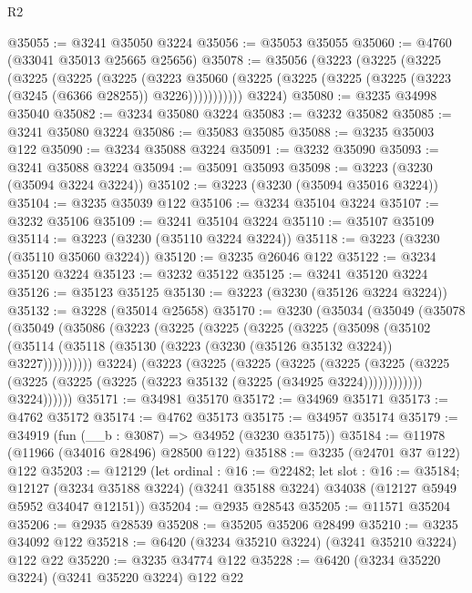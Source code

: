 \begin{lexlean}{R2}
\begin{coremodule}
@35055 := @3241 @35050 @3224
@35056 := @35053 @35055
@35060 := @4760 (@33041 @35013 @25665 @25656)
@35078 := @35056
    (@3223
      (@3225
        (@3225
          (@3225
            (@3225
              (@3225
                (@3223
                  @35060
                  (@3225 (@3225 (@3225 (@3225 (@3223 (@3245 (@6366 @28255)) @3226)))))))))))
      @3224)
@35080 := @3235 @34998 @35040
@35082 := @3234 @35080 @3224
@35083 := @3232 @35082
@35085 := @3241 @35080 @3224
@35086 := @35083 @35085
@35088 := @3235 @35003 @122
@35090 := @3234 @35088 @3224
@35091 := @3232 @35090
@35093 := @3241 @35088 @3224
@35094 := @35091 @35093
@35098 := @3223 (@3230 (@35094 @3224 @3224))
@35102 := @3223 (@3230 (@35094 @35016 @3224))
@35104 := @3235 @35039 @122
@35106 := @3234 @35104 @3224
@35107 := @3232 @35106
@35109 := @3241 @35104 @3224
@35110 := @35107 @35109
@35114 := @3223 (@3230 (@35110 @3224 @3224))
@35118 := @3223 (@3230 (@35110 @35060 @3224))
@35120 := @3235 @26046 @122
@35122 := @3234 @35120 @3224
@35123 := @3232 @35122
@35125 := @3241 @35120 @3224
@35126 := @35123 @35125
@35130 := @3223 (@3230 (@35126 @3224 @3224))
@35132 := @3228 (@35014 @25658)
@35170 := @3230
    (@35034
      (@35049
        (@35078
          (@35049
            (@35086
              (@3223
                (@3225
                  (@3225
                    (@3225
                      (@3225
                        (@35098
                          (@35102
                            (@35114
                              (@35118 (@35130 (@3223 (@3230 (@35126 @35132 @3224)) @3227))))))))))
                @3224)
              (@3223
                (@3225
                  (@3225
                    (@3225
                      (@3225
                        (@3225
                          (@3225 (@3225 (@3225 (@3225 (@3223 @35132 (@3225 (@34925 @3224))))))))))))
                @3224))))))
@35171 := @34981 @35170
@35172 := @34969 @35171
@35173 := @4762 @35172
@35174 := @4762 @35173
@35175 := @34957 @35174
@35179 := @34919 (fun (__b : @3087) => @34952 (@3230 @35175))
@35184 := @11978 (@11966 (@34016 @28496) @28500 @122)
@35188 := @3235 (@24701 @37 @122) @122
@35203 := @12129
    (let ordinal : @16 := @22482;
    let slot : @16 := @35184;
    @12127 (@3234 @35188 @3224) (@3241 @35188 @3224) @34038 (@12127 @5949 @5952 @34047 @12151))
@35204 := @2935 @28543
@35205 := @11571 @35204
@35206 := @2935 @28539
@35208 := @35205 @35206 @28499
@35210 := @3235 @34092 @122
@35218 := @6420 (@3234 @35210 @3224) (@3241 @35210 @3224) @122 @22
@35220 := @3235 @34774 @122
@35228 := @6420 (@3234 @35220 @3224) (@3241 @35220 @3224) @122 @22

\end{coremodule}
\end{lexlean}
